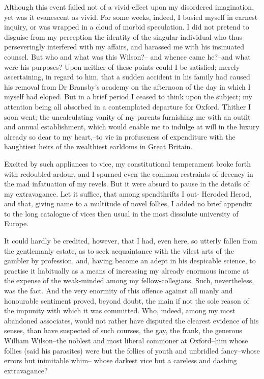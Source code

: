 \documentclass[12pt]{book}
\begin{document}
     Although this event failed not of a vivid effect upon my
disordered imagination, yet was it evanescent as vivid.  For some
weeks, indeed, I busied myself in earnest inquiry, or was wrapped
in a cloud of morbid speculation.  I did not pretend to disguise
from my perception the identity of the singular individual who thus
perseveringly interfered with my affairs, and harassed me 
with his insinuated counsel.  But who and what was this Wilson?--
and whence came he?--and what were his purposes?  Upon neither of
these points could I be satisfied; merely ascertaining, in regard
to him, that a sudden accident in his family had caused his removal
from Dr Bransby's academy on the afternoon of the day in which I
myself had eloped.  But in a brief period I ceased to think upon
the subject; my attention being all absorbed in a contemplated
departure for Oxford.  Thither I soon went; the uncalculating
vanity of my parents furnishing me with an outfit and annual
establishment, which would enable me to indulge at will in the
luxury already so dear to my heart,--to vie in profuseness of
expenditure with the haughtiest heirs of the wealthiest earldoms in
Great Britain.

     Excited by such appliances to vice, my constitutional
temperament broke forth with redoubled ardour, and I spurned even
the common restraints of decency in the mad infatuation of my
revels.  But it were absurd to pause in the details of my
extravagance.  Let it suffice, that among spendthrifts I out-
Heroded Herod, and that, giving name to a multitude of novel
follies, I added no brief appendix to the long catalogue of vices
then usual in the most dissolute university of Europe.

     It could hardly be credited, however, that I had, even here,
so utterly fallen from the gentlemanly estate, as to seek
acquaintance with the vilest arts of the gambler by profession,
and, having become an adept in his despicable science, to practise
it habitually as a means of increasing my already enormous income
at the expense of the weak-minded among my fellow-collegians. 
Such, nevertheless, was the fact.  And the very enormity of this
offence against all manly and honourable sentiment proved, beyond
doubt, the main if not the sole reason of the impunity with which
it was committed.  Who, indeed, among my most abandoned associates,
would not rather have disputed the clearest evidence of his senses,
than have suspected of such courses, the gay, the frank, the
generous William Wilson--the noblest and most liberal commoner at
Oxford--him whose follies (said his parasites) were but the follies
of youth and unbridled fancy--whose errors but inimitable whim--
whose darkest vice but a careless and dashing extravagance? 
\end{document}
